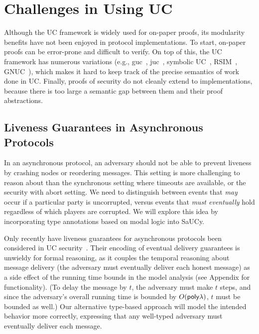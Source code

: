 \section{Challenges in Using UC}
\label{sec:challenges}

Although the UC framework is widely used for on-paper proofs, its modularity
benefits have not been enjoyed in protocol implementations. To start, on-paper
proofs can be error-prone and difficult to verify. On top of this, the UC
framework has numerous variations (e.g., guc~\cite{canetti2007universally},
juc~\cite{canetti2003universal}, symbolic UC~\cite{bohl2016symbolic},
RSIM~\cite{backes2007reactive}, GNUC~\cite{hofheinz2015gnuc}), which makes it
hard to keep track of the precise semantics of work done in UC. Finally, proofs
of security do not cleanly extend to implementations, because there is too large
a semantic gap between them and their proof abstractions.

\subsection{Liveness Guarantees in Asynchronous Protocols}
\label{subsec:liveness}

\todo{} In an asynchronous protocol, an adversary should not be able to prevent liveness
by crashing nodes or reordering messages. This setting is more challenging to
reason about than the synchronous setting where timeouts are available, or the
security with abort setting. We need to distinguish between events that
\emph{may} occur if a particular party is uncorrupted, versus events that
\emph{must eventually} hold regardless of which players are corrupted. We will
explore this idea by incorporating type annotations based on modal logic into
SaUCy.

Only recently have liveness guarantees for asynchronous protocols been
considered in UC security~\cite{coretti2016constant}. Their encoding of eventual
delivery guarantees is unwieldy for formal reasoning, as it couples the temporal
reasoning about message delivery (the adversary must eventually deliver each
honest message) as a side effect of the running time bounds in the model
analysis (see Appendix for functionality). (To delay the message by $t$, the
adversary must make $t$ steps, and since the adversary's overall running time is
bounded by $O(\sf{poly}{\lambda})$, $t$ must be bounded as well.) Our alternative
type-based approach will model the intended behavior more correctly, expressing
that any well-typed adversary must eventually deliver each message.

